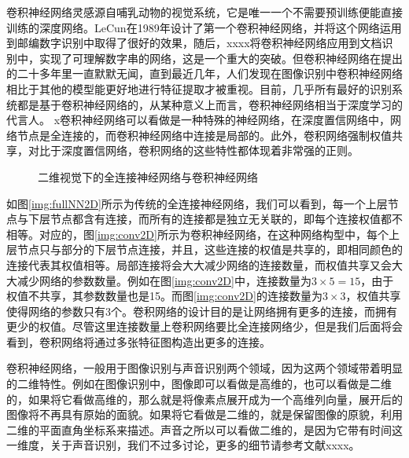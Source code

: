 卷积神经网络灵感源自哺乳动物的视觉系统，它是唯一一个不需要预训练便能直接训练的深度网络。LeCun在1989年设计了第一个卷积神经网络，并将这个网络运用到邮编数字识别中取得了很好的效果，随后，xxxx将卷积神经网络应用到文档识别中，实现了可理解数字串的网络，这是一个重大的突破。但卷积神经网络在提出的二十多年里一直默默无闻，直到最近几年，人们发现在图像识别中卷积神经网络相比于其他的模型能更好地进行特征提取才被重视。目前，几乎所有最好的识别系统都是基于卷积神经网络的，从某种意义上而言，卷积神经网络相当于深度学习的代言人。
x卷积神经网络可以看做是一种特殊的神经网络，在深度置信网络中，网络节点是全连接的，而卷积神经网络中连接是局部的。此外，卷积网络强制权值共享，对比于深度置信网络，卷积网络的这些特性都体现着非常强的正则。

\begin{figure}[htbp]
\centering
\subfigure{\label{img:fullNN2D}}\addtocounter{subfigure}{-2}
\subfigure{\label{img:conv2D}}\addtocounter{subfigure}{-2}
\caption{二维视觉下的全连接神经网络与卷积神经网络}
\vspace{-1em}
\end{figure}

如图\ref{img:fullNN2D}所示为传统的全连接神经网络，我们可以看到，每一个上层节点与下层节点都含有连接，而所有的连接都是独立无关联的，即每个连接权值都不相等。对应的，图\ref{img:conv2D}所示为卷积神经网络，在这种网络构型中，每个上层节点只与部分的下层节点连接，并且，这些连接的权值是共享的，即相同颜色的连接代表其权值相等。局部连接将会大大减少网络的连接数量，而权值共享又会大大减少网络的参数数量。例如在图\ref{img:conv2D}中，连接数量为$3\times 5 = 15$，由于权值不共享，其参数数量也是15。而图\ref{img:conv2D}的连接数量为$3\times 3$，权值共享使得网络的参数只有3个。卷积网络的设计目的是让网络拥有更多的连接，而拥有更少的权值。尽管这里连接数量上卷积网络要比全连接网络少，但是我们后面将会看到，卷积网络将通过多张特征图构造出更多的连接。

卷积神经网络，一般用于图像识别与声音识别两个领域，因为这两个领域带着明显的二维特性。例如在图像识别中，图像即可以看做是高维的，也可以看做是二维的，如果将它看做高维的，那么就是将像素点展开成为一个高维列向量，展开后的图像将不再具有原始的面貌。如果将它看做是二维的，就是保留图像的原貌，利用二维的平面直角坐标系来描述。声音之所以可以看做二维的，是因为它带有时间这一维度，关于声音识别，我们不过多讨论，更多的细节请参考文献xxxx。

